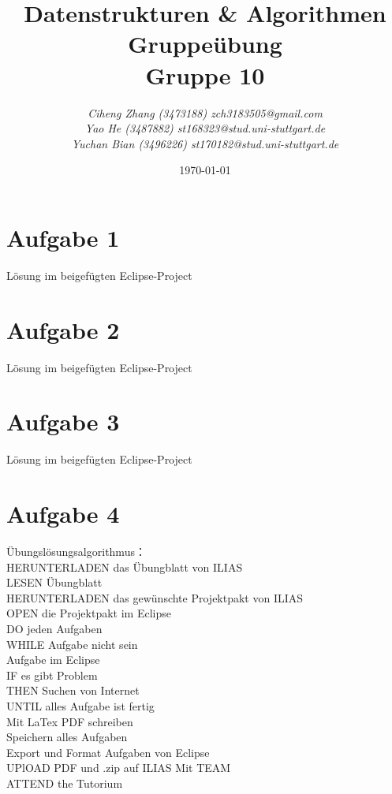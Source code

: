 \documentclass{article}
\begin{document}
\begin{titlepage}
    \title{\Huge \textbf{Datenstrukturen \& Algorithmen Gruppeübung\\Gruppe 10} }
    \author{\LARGE \textsl{Ciheng Zhang (3473188) zch3183505@gmail.com}\\\LARGE \textsl{Yao He (3487882) st168323@stud.uni-stuttgart.de}\\\LARGE \textsl{Yuchan Bian (3496226) st170182@stud.uni-stuttgart.de} \\[200pt]}
    \date{\today}
    \maketitle
    \thispagestyle{empty}
\end{titlepage}
\newpage
\section{Aufgabe 1}
Lösung im beigefügten Eclipse-Project
\section{Aufgabe 2}
Lösung im beigefügten Eclipse-Project
\section{Aufgabe 3}
Lösung im beigefügten Eclipse-Project
\section{Aufgabe 4}
Übungslösungsalgorithmus：
\\HERUNTERLADEN das Übungblatt von ILIAS
\\LESEN Übungblatt
\\HERUNTERLADEN das gewünschte Projektpakt von ILIAS
\\OPEN die Projektpakt im Eclipse
\\DO jeden Aufgaben
\\\indent WHILE Aufgabe nicht sein
\\\indent Aufgabe im Eclipse
\\\indent IF es gibt Problem
\\\indent \indent THEN Suchen von Internet
\\\indent UNTIL alles Aufgabe ist fertig
\\Mit LaTex PDF schreiben
\\Speichern alles Aufgaben
\\Export und Format Aufgaben von Eclipse
\\UPlOAD PDF und .zip auf ILIAS Mit TEAM
\\ATTEND the Tutorium
\end{document}
